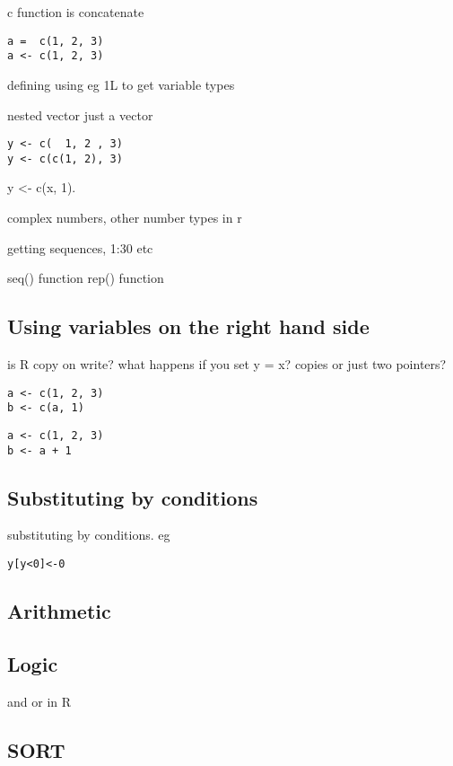 c function is concatenate

\begin{verbatim}
a =  c(1, 2, 3)
a <- c(1, 2, 3)
\end{verbatim}
defining using eg 1L to get variable types

nested vector just a vector

\begin{verbatim}
y <- c(  1, 2 , 3)
y <- c(c(1, 2), 3)
\end{verbatim}
y <- c(x, 1). 



complex numbers, other number types in r


getting sequences, 1:30 etc

seq() function
rep() function


\subsection{Using variables on the right hand side}


is R copy on write? what happens if you set y = x? copies or just two pointers?

\begin{verbatim}
a <- c(1, 2, 3)
b <- c(a, 1)
\end{verbatim}

\begin{verbatim}
a <- c(1, 2, 3)
b <- a + 1
\end{verbatim}


\subsection{Substituting by conditions}
substituting by conditions. eg

\begin{verbatim}
y[y<0]<-0
\end{verbatim}

\subsection{Arithmetic}

\subsection{Logic}

and or in R

\subsection{SORT}


